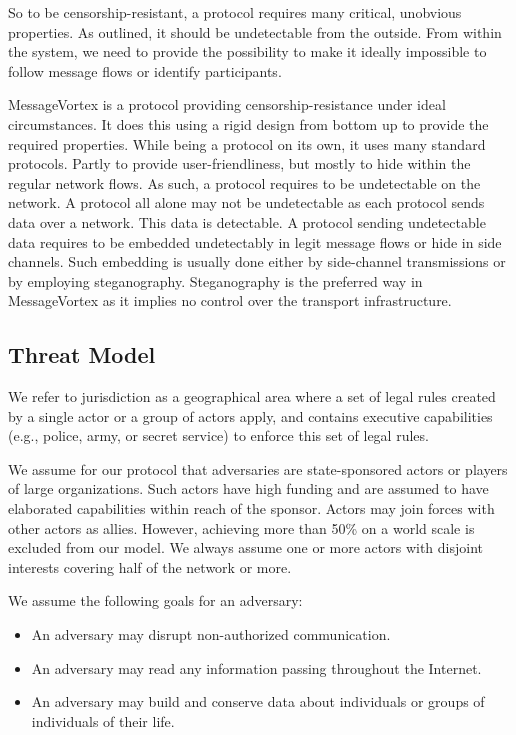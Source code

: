 \documentclass[10pt,journal,compsoc,twocolumn,twoside]{IEEEtran}
\begin{document}
So to be censorship-resistant, a protocol requires many critical, unobvious properties. As outlined, it should be undetectable from the outside. From within the system, we need to provide the possibility to make it ideally impossible to follow message flows or identify participants.

MessageVortex is a protocol providing censorship-resistance under ideal circumstances. It does this using a rigid design from bottom up to provide the required properties. While being a protocol on its own, it uses many standard protocols. Partly to provide user-friendliness, but mostly to hide within the regular network flows. As such, a protocol requires to be undetectable on the network. A protocol all alone may not be undetectable as each protocol sends data over a network. This data is detectable. A protocol sending undetectable data requires to be embedded undetectably in legit message flows or hide in side channels. Such embedding is usually done either by side-channel transmissions or by employing steganography. Steganography is the preferred way in MessageVortex as it implies no control over the transport infrastructure.

\subsection{Threat Model}
We refer to jurisdiction as a geographical area where a set of legal rules created by a single actor or a group of actors apply, and contains executive capabilities (e.g., police, army, or secret service) to enforce this set of legal rules.

We assume for our protocol that adversaries are state-sponsored actors or players of large organizations. Such actors have high funding and are assumed to have elaborated capabilities within reach of the sponsor. Actors may join forces with other actors as allies. However, achieving more than 50\% on a world scale is excluded from our model. We always assume one or more actors with disjoint interests covering half of the network or more. 

We assume the following goals for an adversary:
\begin{itemize}
	\item An adversary may disrupt non-authorized communication.
	\item An adversary may read any information passing throughout the Internet.
	\item An adversary may build and conserve data about individuals or groups of individuals of their life. 
\end{itemize}
\end{document}
